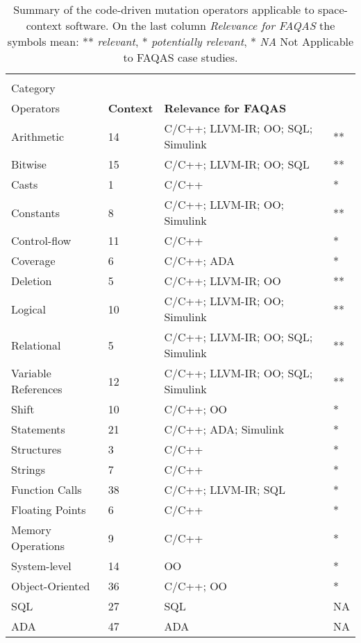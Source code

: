 


\setlength\LTleft{0pt}
\setlength\LTright{0pt}
\small 
\begin{longtable}{@{\extracolsep{\fill}}|l|l|l|l|@{}}
\caption{\normalsize Summary of the code-driven mutation operators applicable to space-context software. On the last column \emph{Relevance for FAQAS} the symbols mean: ** \textit{relevant}, * \textit{potentially relevant}, * \textit{NA} Not Applicable to FAQAS case studies.}
\label{table:codeoperatorssummary} \\
\hline

	\textbf{\begin{tabular}[c]{@{}l@{}}Operator\\Category\end{tabular}}	&	\textbf{\begin{tabular}[c]{@{}l@{}}Number of\\Operators\end{tabular}}	&	\textbf{Context}	&	\textbf{Relevance for FAQAS}\\

\hline
	Arithmetic			&	14	&	C/C++; LLVM-IR; OO; SQL; Simulink	& **\\
	Bitwise				&	15	&	C/C++; LLVM-IR; OO; SQL 			& **\\
	Casts				&	1	&	C/C++ 								& *\\
	Constants			&	8	&	C/C++; LLVM-IR; OO; Simulink 		& **\\
	Control-flow		&	11	&	C/C++ & *\\
	Coverage			&	6	&	C/C++; ADA & *\\
	Deletion			&	5	&	C/C++; LLVM-IR; OO & **\\
	Logical				&	10	&	C/C++; LLVM-IR; OO; Simulink & **\\
	Relational			&	5	&	C/C++; LLVM-IR; OO; SQL; Simulink & **\\
	Variable References	&	12	&	C/C++; LLVM-IR; OO; SQL; Simulink & **\\
	Shift				&	10	&	C/C++; OO & *\\
	Statements			&	21	&	C/C++; ADA; Simulink & *\\
	Structures			&	3	&	C/C++ & *\\
	Strings				&	7	&	C/C++ & *\\
	Function Calls		&	38	&	C/C++; LLVM-IR; SQL & *\\
	Floating Points		&	6	&	C/C++ & *\\
	Memory Operations	&	9	&	C/C++ & *\\
	System-level		&	14	&	OO & *\\
	Object-Oriented		&	36	&	C/C++; OO & *\\
	SQL					&	27	&	SQL & NA\\
	ADA					&	47	&	ADA & NA\\
\bottomrule                                                             
\end{longtable}
\normalsize